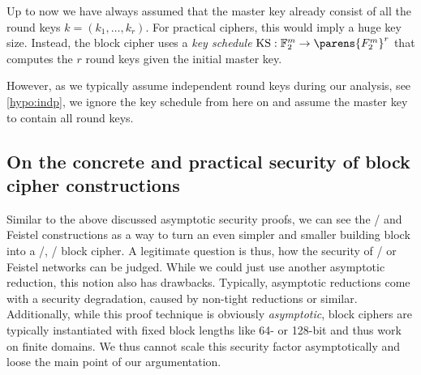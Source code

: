 Up to now we have always assumed that the master key already consist of all the round keys $k = (k_1, \ldots, k_r)$.
For practical ciphers, this would imply a huge key size.
Instead, the block cipher uses a \emph{key schedule} $\mathrm{KS} : \F_2^m \to \parens{F_2^m}^r$ that computes the $r$ round keys given the initial master key.

However, as we typically assume independent round keys during our analysis, see \cref{hypo:indp}, we ignore the key schedule from here on and assume the master key to contain all round keys.

\subsection{On the concrete and practical security of block cipher constructions}\label{sec:prelim:concrete-sec}
Similar to the above discussed asymptotic security proofs, we can see the \SPN/ and Feistel constructions as a way to turn an even simpler and smaller building block into a \PRP/, \resp/ block cipher.
A legitimate question is thus, how the security of \SPNp/ or Feistel networks can be judged.
While we could just use another asymptotic reduction, this notion also has drawbacks.
Typically, asymptotic reductions come with a security degradation, caused by non-tight reductions or similar.
Additionally, while this proof technique is obviously \emph{asymptotic}, block ciphers are typically instantiated with fixed block lengths like 64- or 128-bit and thus work on finite domains.
We thus cannot scale this security factor asymptotically and loose the main point of our argumentation.

